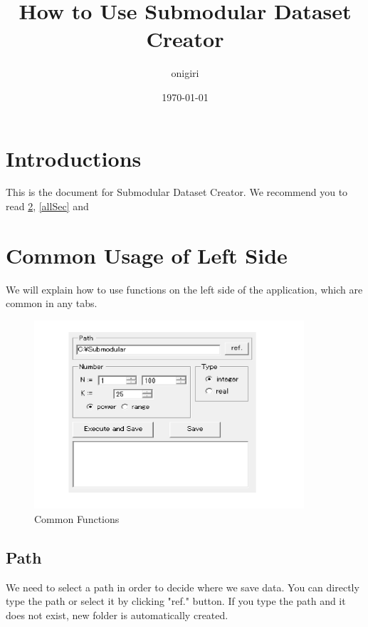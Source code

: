 \documentclass{article}
\begin{document}
\fontsize{10pt}{12pt}\selectfont
%

\title{How to Use Submodular Dataset Creator }
\author{onigiri}
\date{\today}


\maketitle
\newpage


\tableofcontents

\newpage

\section{Introductions}
This is the document for Submodular Dataset Creator.
We recommend you to read \ref{commonLeftSec}, \ref{allSec} and 


\section{Common Usage of Left Side}\label{commonLeftSec}
We will explain how to use functions on the left side of the application,
which are common in any tabs.

\begin{figure}[h!]\label{commonPic}
{
\fontsize{10pt}{12pt}\selectfont
\centering
\includegraphics[height=7.0cm]{picture/CommonFunction.png}
\caption{Common Functions}
}
\end{figure}

\subsection{Path}\label{pathSec}
We need to select a path in order to decide where we save data.
You can directly type the path or select it by clicking "ref." button.
If you type the path and it does not exist,
new folder is automatically created.
\end{document}
